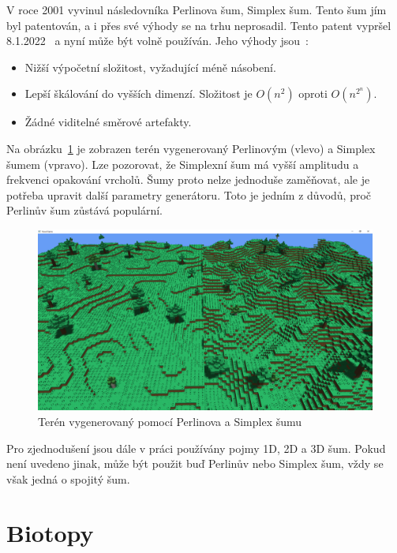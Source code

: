 \documentclass[thesis=M,czech]{FITthesis}[2019/12/23]
\begin{document}
V roce 2001 vyvinul následovníka Perlinova šum, Simplex šum. Tento šum jím byl patentován, a i přes své výhody se na trhu neprosadil. Tento patent vypršel 8.1.2022~\cite{patent} a nyní může být volně používán. Jeho výhody jsou~\cite{simplex_perlin}:

\begin{itemize}
\item Nižší výpočetní složitost, vyžadující méně násobení.
\item Lepší škálování do vyšších dimenzí. Složitost je $O(n^2)$ oproti $O(n^{2^n})$.
\item Žádné viditelné směrové artefakty.
\end{itemize}

Na obrázku~\ref{fig:perlin_simplex} je zobrazen terén vygenerovaný Perlinovým (vlevo) a Simplex šumem (vpravo). Lze pozorovat, že Simplexní šum má vyšší amplitudu a frekvenci opakování vrcholů. Šumy proto nelze jednoduše zaměňovat, ale je potřeba upravit další parametry generátoru. Toto je jedním z důvodů, proč Perlinův šum zůstává populární.

\begin{figure}\centering
	\includegraphics[width=\textwidth]{images/world_gen/perlin_simplex}
	\caption[Terén vygenerovaný pomocí Perlinova a Simplex šumu]{Terén vygenerovaný pomocí Perlinova a Simplex šumu}\label{fig:perlin_simplex}
\end{figure}

Pro zjednodušení jsou dále v práci používány pojmy 1D, 2D a 3D šum. Pokud není uvedeno jinak, může být použit buď Perlinův nebo Simplex šum, vždy se však jedná o spojitý šum.

\section{Biotopy}
\end{document}
